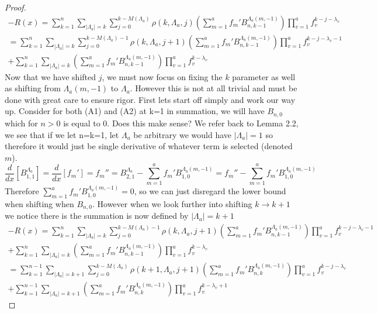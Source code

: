 \documentclass[11pt]{article}
\theoremstyle{plain}
\theoremstyle{definition}
\begin{document}
\begin{proof}
\begin{align*}
    -R(x) = \sum_{k=1}^n \sum_{|\Lambda_a|=k}\sum_{j=0}^{k-M(\Lambda_a)} \rho(k,\Lambda_a,j) \left(\sum_{m=1}^af_m'B_{n,k-1}^{\Lambda_a(m,-1)}\right)\prod_{v=1}^a f_v^{k-j-\lambda_v} \\
    = \sum_{k=1}^n \sum_{|\Lambda_a|=k}\sum_{j=0}^{k-M(\Lambda_a)-1} \rho(k,\Lambda_a,j+1)\left(\sum_{m=1}^af_m'B_{n,k-1}^{\Lambda_a(m,-1)}\right) \prod_{v=1}^a f_v^{k-j-\lambda_v-1} \tag{A1}\\
    +\sum_{k=1}^n \sum_{|\Lambda_a|=k}\left(\sum_{m=1}^af_m'B_{n,k-1}^{\Lambda_a(m,-1)}\right) \prod_{v=1}^a f_v^{k-\lambda_v}\tag{A2}
\end{align*}
Now that we have shifted $j$, we must now focus on fixing the $k$ parameter as well as shifting from $\Lambda_a(m,-1)$ to $\Lambda_a$. However this is not at all trivial and must be done with great care to ensure rigor. First lets start off simply and work our way up. Consider for both (A1) and (A2) at k=1 in summation, we will have $B_{n,0}$ which for $n>0$ is equal to $0$. Does this make sense? We refer back to Lemma 2.2, we see that if we let n=k=1, let $\Lambda_a$ be arbitrary we would have $|\Lambda_a|=1$ so therefore it would just be single derivative of whatever term is selected (denoted $m$). 
\begin{equation*}
\frac{d}{dx}\left[B_{1,1}^{\Lambda_a}\right] = \frac{d}{dx}\left[f_m'\right] = f_m'' = B_{2,1}^{\Lambda_a}-\sum_{m=1}^a f_m' B_{1,0}^{\Lambda_a(m,-1)} = f_m''-\sum_{m=1}^a f_m' B_{1,0}^{\Lambda_a(m,-1)}
\end{equation*}
Therefore $\sum_{m=1}^a f_m' B_{1,0}^{\Lambda_a(m,-1)}=0$, so we can just disregard the lower bound when shifting when $B_{n,0}$. However when we look further into shifting $k \xrightarrow{} k+1$ we notice there is the summation is now defined by $|\Lambda_a|=k+1$
\begin{align*}
    -R(x) = \sum_{k=1}^n \sum_{|\Lambda_a|=k}\sum_{j=0}^{k-M(\Lambda_a)-1} \rho(k,\Lambda_a,j+1)\left(\sum_{m=1}^af_m'B_{n,k-1}^{\Lambda_a(m,-1)}\right) \prod_{v=1}^a f_v^{k-j-\lambda_v-1} \tag{A1}\\
    +\sum_{k=1}^n \sum_{|\Lambda_a|=k}\left(\sum_{m=1}^af_m'B_{n,k-1}^{\Lambda_a(m,-1)}\right) \prod_{v=1}^a f_v^{k-\lambda_v}\tag{A2} \\
    = \sum_{k=1}^{n-1} \sum_{|\Lambda_a|=k+1}\sum_{j=0}^{k-M(\Lambda_a)} \rho(k+1,\Lambda_a,j+1)\left(\sum_{m=1}^af_m'B_{n,k}^{\Lambda_a(m,-1)}\right) \prod_{v=1}^a f_v^{k-j-\lambda_v} \\
    +\sum_{k=1}^{n-1} \sum_{|\Lambda_a|=k+1}\left(\sum_{m=1}^af_m'B_{n,k}^{\Lambda_a(m,-1)}\right) \prod_{v=1}^a f_v^{k-\lambda_v+1}

\end{align*}
\end{proof}
\end{document}
